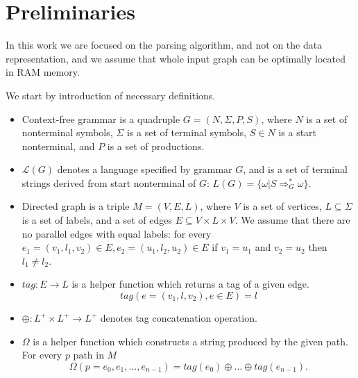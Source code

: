 \section{Preliminaries}

In this work we are focused on the parsing algorithm, and not on the data representation, and we assume that whole input graph can be optimally located in RAM memory.

We start by introduction of necessary definitions.
\begin{itemize}
  \item Context-free grammar is a quadruple $G=(N, \Sigma, P, S)$, where $N$ is a set of nonterminal symbols, $\Sigma$ is a set of terminal symbols, $S \in N$ is a start nonterminal, and $P$ is a set of productions. 
  \item $\mathcal{L}(G)$ denotes a language specified by grammar $G$, and is a set of terminal strings derived from start nonterminal of $G$: $L(G) = \{\omega | S \Rightarrow_{G}^{*} \omega\}$.
  \item Directed graph is a triple $M = (V,E,L)$, where $V$ is a set of vertices, $L \subseteq \Sigma$ is a set of labels, and a set of edges $E\subseteq V\times L\times V$. 
  We assume that there are no parallel edges with equal labels: for every $e_1=(v_1,l_1,v_2) \in E, e_2=(u_1,l_2,u_2) \in E$ if $v_1 = u_1$ and $v_2 = u_2$ then $l_1 \neq l_2$.
  \item $tag: E \rightarrow L$ is a helper function which returns a tag of a given edge. $$tag(e = (v_1,l,v_2), e \in E) = l$$
  \item $\oplus: L^+ \times L^+ \rightarrow L^+$ denotes tag concatenation operation.
  \item $\Omega$ is a helper function which constructs a string produced by the given path. For every $p \text{ path in } M$
  $$ \Omega(p = e_{0},e_{1},\dots,e_{n-1}) = tag (e_{0}) \oplus \dots \oplus tag (e_{n-1}).$$
\end{itemize}

